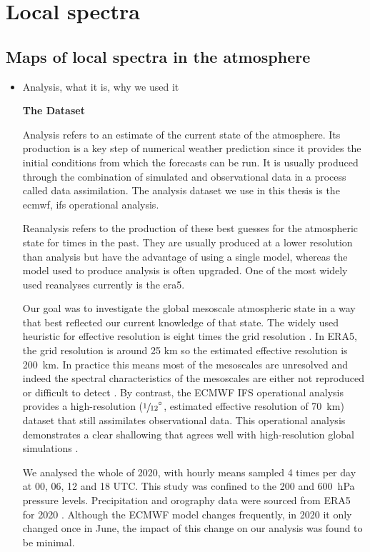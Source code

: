\chapter{Local spectra}
\label{chapter:results} 


\section{Maps of local spectra in the atmosphere}

\begin{itemize}
		
\item Analysis, what it is, why we used it

\textbf{The Dataset}

Analysis refers to an estimate of the current state of the atmosphere. Its production is a key step of numerical weather prediction since it provides the initial conditions from which the forecasts can be run. It is usually produced through the combination of simulated and observational data in a process called data assimilation. The analysis dataset we use in this thesis is the \gls{ecmwf}, \gls{ifs} operational analysis.

Reanalysis refers to the production of these best guesses for the atmospheric state for times in the past. They are usually produced at a lower resolution than analysis but have the advantage of using a single model, whereas the model used to produce analysis is often upgraded. One of the most widely used reanalyses currently is the \gls{era5}.

Our goal was to investigate the global mesoscale atmospheric state in a way that best reflected our current knowledge of that state. The widely used heuristic for effective resolution is eight times the grid resolution \cite{skamarock2004evaluating}. In ERA5, the grid resolution is around 25 km so the estimated effective resolution is 200~km. In practice this means most of the mesoscales are unresolved and indeed the spectral characteristics of the mesoscales are either not reproduced or difficult to detect \cite{li2023intercomparison}. By contrast, the ECMWF IFS operational analysis provides a high-resolution ($\sfrac{1}{12}^\circ$, estimated effective resolution of 70~km) dataset that still assimilates observational data. This operational analysis demonstrates a clear shallowing that agrees well with high-resolution global simulations \cite{Wang2021a, stephan2022atmospheric}. 

We analysed the whole of 2020, with hourly means sampled 4 times per day at 00, 06, 12 and 18 UTC. This study was confined to the 200 and 600~hPa pressure levels. Precipitation and orography data were sourced from ERA5 for 2020 \cite{hersbach2020era5}. Although the ECMWF model changes frequently, in 2020 it only changed once in June, the impact of this change on our analysis was found to be minimal. 


\end{itemize}
